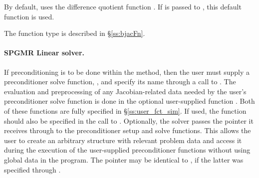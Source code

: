 {
  By default, {\idaband} uses the difference quotient function .
  If  is passed to , this default function is used.

  The function type  is described in \S\ref{ss:bjacFn}.
}
\noindent\paragraph{\bf SPGMR Linear solver.}
If preconditioning is to be done within the {\spgmr} method, then the user
must supply a preconditioner solve function, , and specify its
name through a call to .
The evaluation and preprocessing of any Jacobian-related data needed
by the user's preconditioner solve function is done in the optional
user-supplied function . Both of these functions are
fully specified in \S\ref{ss:user_fct_sim}.
If used, the  function should also be specified in the call to
.
Optionally, the {\idaspgmr} solver passes the pointer it receives through 
 to the preconditioner setup and solve functions.  
This allows the user to create an arbitrary structure with relevant problem data 
and access it during the execution of the user-supplied preconditioner functions
without using global data in the program.  
The pointer  may be identical to , if the latter was 
specified through .

